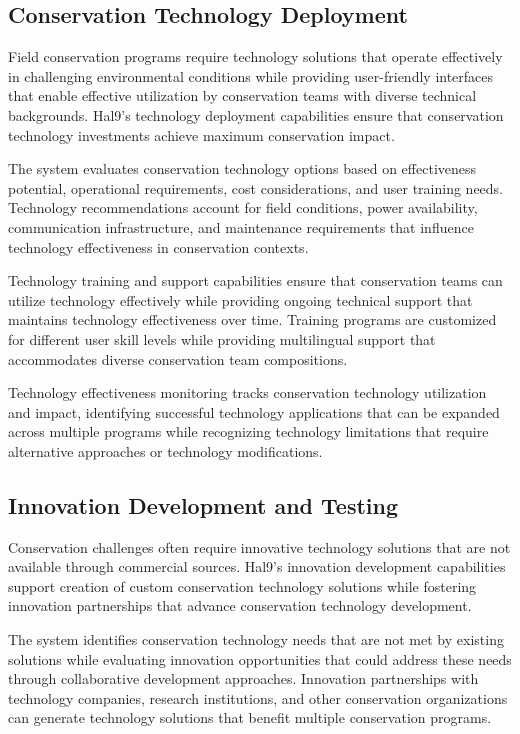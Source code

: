 \documentclass[
  Letterpaper,
]{scrbook}
\begin{document}
\subsection{Conservation Technology
Deployment}\label{conservation-technology-deployment}

Field conservation programs require technology solutions that operate
effectively in challenging environmental conditions while providing
user-friendly interfaces that enable effective utilization by
conservation teams with diverse technical backgrounds. Hal9's technology
deployment capabilities ensure that conservation technology investments
achieve maximum conservation impact.

The system evaluates conservation technology options based on
effectiveness potential, operational requirements, cost considerations,
and user training needs. Technology recommendations account for field
conditions, power availability, communication infrastructure, and
maintenance requirements that influence technology effectiveness in
conservation contexts.

Technology training and support capabilities ensure that conservation
teams can utilize technology effectively while providing ongoing
technical support that maintains technology effectiveness over time.
Training programs are customized for different user skill levels while
providing multilingual support that accommodates diverse conservation
team compositions.

Technology effectiveness monitoring tracks conservation technology
utilization and impact, identifying successful technology applications
that can be expanded across multiple programs while recognizing
technology limitations that require alternative approaches or technology
modifications.

\subsection{Innovation Development and
Testing}\label{innovation-development-and-testing}

Conservation challenges often require innovative technology solutions
that are not available through commercial sources. Hal9's innovation
development capabilities support creation of custom conservation
technology solutions while fostering innovation partnerships that
advance conservation technology development.

The system identifies conservation technology needs that are not met by
existing solutions while evaluating innovation opportunities that could
address these needs through collaborative development approaches.
Innovation partnerships with technology companies, research
institutions, and other conservation organizations can generate
technology solutions that benefit multiple conservation programs.
\end{document}
